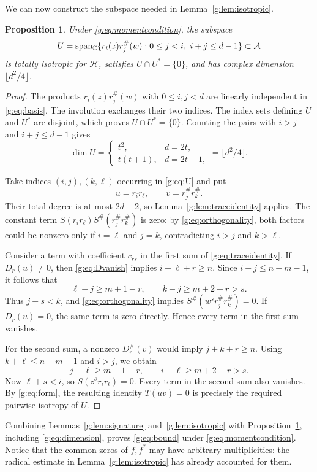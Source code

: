 \documentclass[UTF8,11pt]{ctexart}
\newtheorem{prop}[thm]{Proposition}
\theoremstyle{definition}
\numberwithin{equation}{section}
\newcommand{\HH}{\mathcal H}\newcommand{\Ecal}{\mathcal E}
\begin{document}
We can now construct the subspace needed in Lemma~\ref{g:lem:isotropic}.
\begin{prop}\label{g:prop:U}
Under \eqref{g:eq:momentcondition}, the subspace
\begin{equation}\label{g:eq:U}
 U=\operatorname{span_{\mathbb C}}\{r_i(z)r_j^\#(w):0\le j<i,\ i+j\le d-1\}\subset\mathcal A
\end{equation}
is totally isotropic for $\HH$, satisfies $U\cap U^*=\{0\}$, and has
complex dimension $\lfloor d^2/4\rfloor$.
\end{prop}
\begin{proof}
The products $r_i(z)r_j^\#(w)$ with $0\le i,j<d$ are linearly independent
in \eqref{g:eq:basis}. The involution exchanges their two indices.
The index sets defining $U$ and $U^*$ are disjoint, which proves
$U\cap U^*=\{0\}$. Counting the pairs with $i>j$ and $i+j\le d-1$ gives
\begin{equation}\label{g:eq:dimension}
 \dim U=
 \begin{cases}
 t^2,&d=2t,\\
 t(t+1),&d=2t+1,
 \end{cases}
 =\lfloor d^2/4\rfloor.
\end{equation}

Take indices $(i,j),(k,\ell)$ occurring in \eqref{g:eq:U} and put
\[
 u=r_i r_\ell,\qquad v=r_j^\# r_k^\#.
\]
Their total degree is at most $2d-2$, so Lemma~\ref{g:lem:traceidentity}
applies. The constant term $S(r_i r_\ell)S^\#(r_j^\#r_k^\#)$ is zero:
by \eqref{g:eq:orthogonality}, both factors could be nonzero only if
$i=\ell$ and $j=k$, contradicting $i>j$ and $k>\ell$.

Consider a term with coefficient $c_{rs}$ in the first sum of
\eqref{g:eq:traceidentity}. If $D_r(u)\ne0$, then \eqref{g:eq:Dvanish} implies
$i+\ell+r\ge n$. Since $i+j\le n-m-1$, it follows that
\[
 \ell-j\ge m+1-r,\qquad k-j\ge m+2-r>s.
\]
Thus $j+s<k$, and \eqref{g:eq:orthogonality} implies
$S^\#(w^s r_j^\# r_k^\#)=0$. If $D_r(u)=0$, the same term is zero directly.
Hence every term in the first sum vanishes.

For the second sum, a nonzero $D_r^\#(v)$ would imply $j+k+r\ge n$.
Using $k+\ell\le n-m-1$ and $i>j$, we obtain
\[
 j-\ell\ge m+1-r,\qquad i-\ell\ge m+2-r>s.
\]
Now $\ell+s<i$, so $S(z^s r_i r_\ell)=0$. Every term in the second sum
also vanishes. By \eqref{g:eq:form}, the resulting identity $T(uv)=0$ is
precisely the required pairwise isotropy of $U$.
\end{proof}

Combining Lemmas~\ref{g:lem:signature} and~\ref{g:lem:isotropic} with
Proposition~\ref{g:prop:U}, including \eqref{g:eq:dimension}, proves \eqref{g:eq:bound} under
\eqref{g:eq:momentcondition}. Notice that the common zeros of $f,f^*$ may
have arbitrary multiplicities: the radical estimate in
Lemma~\ref{g:lem:isotropic} has already accounted for them.
\end{document}

